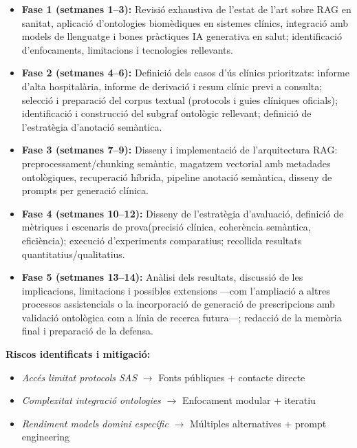 \documentclass[11pt,a4paper]{article}
\begin{document}
\begin{itemize}
    \item \textbf{Fase 1 (setmanes 1--3):}
    Revisió exhaustiva de l'estat de l'art sobre RAG en sanitat, aplicació d'ontologies biomèdiques en sistemes clínics, integració amb models de llenguatge i bones pràctiques IA generativa en salut; identificació d'enfocaments, limitacions i tecnologies rellevants.
    
    \item \textbf{Fase 2 (setmanes 4--6):} Definició dels casos d'ús clínics prioritzats: informe d'alta hospitalària, informe de derivació i resum clínic previ a consulta; selecció i preparació del corpus textual (protocols i guies clíniques oficials); identificació i construcció del subgraf ontològic rellevant; definició de l'estratègia d'anotació semàntica.

    \item \textbf{Fase 3 (setmanes 7--9):} Disseny i implementació de l'arquitectura RAG: preprocessament/chunking semàntic, magatzem vectorial amb metadades ontològiques, recuperació híbrida, pipeline anotació semàntica, disseny de prompts per generació clínica.
      
    \item \textbf{Fase 4 (setmanes 10--12):} Disseny de l'estratègia d'avaluació, definició de mètriques i escenaris de prova(precisió clínica, coherència semàntica, eficiència); execució d'experiments comparatius; recollida resultats quantitatius/qualitatius.

    \item \textbf{Fase 5 (setmanes 13--14):} Anàlisi dels resultats, discussió de les implicacions, limitacions i possibles extensions ---com l'ampliació a altres processos assistencials o la incorporació de generació de prescripcions amb validació ontològica com a línia de recerca futura---; redacció de la memòria final i preparació de la defensa.
  
\end{itemize}

\textbf{Riscos identificats i mitigació:}
\begin{itemize}
\item \textit{Accés limitat protocols SAS} $\to$ Fonts públiques + contacte directe
\item \textit{Complexitat integració ontologies} $\to$ Enfocament modular + iteratiu
\item \textit{Rendiment models domini específic} $\to$ Múltiples alternatives + prompt engineering
\end{itemize}
\end{document}
